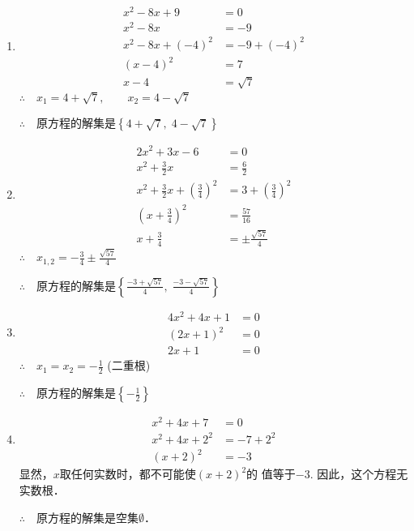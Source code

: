 \begin{solution}
\begin{enumerate}
    \item \begin{align*}
        x^2-8x+9&=0\\
        x^2-8x&=-9\tag{移项}\\
        x^2-8x+(-4)^2&=-9+(-4)^2 \tag{配方}\\
        (x-4)^2&=7\\
        x-4&=\sqrt{7} \tag{平方根的意义}
    \end{align*}
$\therefore\quad x_1=4+\sqrt{7},\qquad x_2=4-\sqrt{7}$

$\therefore\quad $原方程的解集是$\left\{4+\sqrt{7},\; 4-\sqrt{7}\right\}$
    \item \begin{align*}
        2x^2+3x-6&=0\\
x^2+\frac{3}{2}x&=\frac{6}{2}\\
x^2+\frac{3}{2}x+\left(\frac{3}{4}\right)^2&=3+\left(\frac{3}{4}\right)^2\\
\left(x+\frac{3}{4}\right)^2&=\frac{57}{16}\\
x+\frac{3}{4}&=\pm\frac{\sqrt{57}}{4}
    \end{align*}
    $\therefore\quad x_{1,2}=-\frac{3}{4}\pm \frac{\sqrt{57}}{4}$

$\therefore\quad $原方程的解集是$\left\{\frac{-3+\sqrt{57}}{4},\; \frac{-3-\sqrt{57}}{4} \right\}$
    \item \begin{align*}
            4x^2+4x+1&=0\\
            (2x+1)^2&=0\\
            2x+1&=0
    \end{align*}
    $\therefore\quad x_{1}=x_2=-\frac{1}{2}$ (二重根)

$\therefore\quad $原方程的解集是$\left\{-\frac{1}{2}\right\}$
    \item \begin{align*}
        x^2+4x+7&=0\\
        x^2+4x+2^2&=-7+2^2\\
(x+2)^2&=-3
    \end{align*}
    显然，$x$取任何实数时，都不可能使$(x+2)^2$的
值等于$-3$. 因此，这个方程无实数根．

$\therefore\quad$原方程的解集是空集$\emptyset$．

\end{enumerate}
\end{solution}

